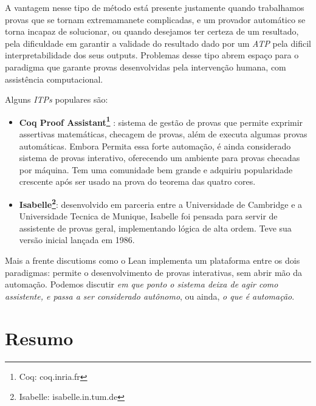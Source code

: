 A vantagem nesse tipo de método está presente justamente quando trabalhamos provas que se tornam extremamanete complicadas, e um provador automático se torna incapaz de solucionar, ou quando desejamos ter certeza de um resultado, pela dificuldade em garantir a validade do resultado dado por um \textit{ATP} pela dificil interpretabilidade dos seus outputs.
Problemas desse tipo abrem espaço para o paradigma que garante provas desenvolvidas pela intervenção humana, com assistência computacional.

Alguns \textit{ITPs} populares são:
\begin{itemize}
    \item \textbf{Coq Proof Assistant\footnote{Coq: coq.inria.fr}} : sistema de gestão de provas que permite exprimir assertivas matemáticas, checagem de provas, além de executa algumas provas automáticas. Embora Permita essa forte automação, é ainda considerado sistema de provas interativo, oferecendo um ambiente para provas checadas por máquina. Tem uma comunidade bem grande e adquiriu popularidade crescente após ser usado na prova do teorema das quatro cores.

    \item \textbf{Isabelle\footnote{Isabelle: isabelle.in.tum.de}}: desenvolvido em parceria entre a Universidade de Cambridge e a Universidade Tecnica de Munique, Isabelle foi pensada para servir de assistente de provas geral, implementando lógica de alta ordem. Teve sua versão inicial lançada em 1986.
\end{itemize}

Mais a frente discutioms como o Lean implementa um plataforma entre os dois paradigmas: permite o desenvolvimento de provas interativas, sem abrir mão da automação.
Podemos discutir \textit{em que ponto o sistema deixa de agir como assistente, e passa a ser considerado autônomo}, ou ainda, \textit{o que é automação}.


\section{Resumo}
